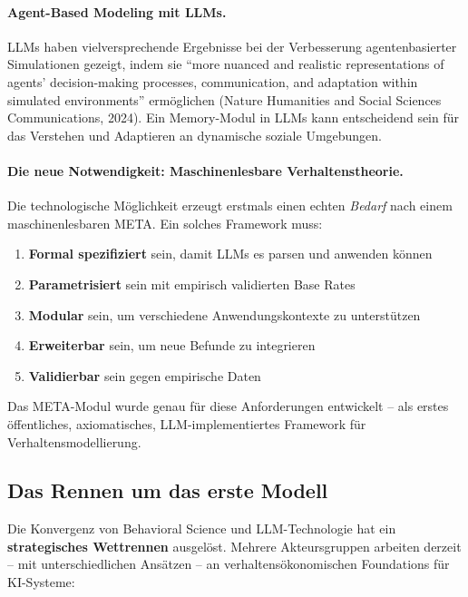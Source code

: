 \paragraph{Agent-Based Modeling mit LLMs.}
LLMs haben vielversprechende Ergebnisse bei der Verbesserung agentenbasierter Simulationen gezeigt, indem sie ``more nuanced and realistic representations of agents' decision-making processes, communication, and adaptation within simulated environments'' ermöglichen (Nature Humanities and Social Sciences Communications, 2024). Ein Memory-Modul in LLMs kann entscheidend sein für das Verstehen und Adaptieren an dynamische soziale Umgebungen.

\paragraph{Die neue Notwendigkeit: Maschinenlesbare Verhaltenstheorie.}
Die technologische Möglichkeit erzeugt erstmals einen echten \textit{Bedarf} nach einem maschinenlesbaren META. Ein solches Framework muss:

\begin{enumerate}[label=(\roman*)]
    \item \textbf{Formal spezifiziert} sein, damit LLMs es parsen und anwenden können
    \item \textbf{Parametrisiert} sein mit empirisch validierten Base Rates
    \item \textbf{Modular} sein, um verschiedene Anwendungskontexte zu unterstützen
    \item \textbf{Erweiterbar} sein, um neue Befunde zu integrieren
    \item \textbf{Validierbar} sein gegen empirische Daten
\end{enumerate}

Das \BCM{} META-Modul wurde genau für diese Anforderungen entwickelt -- als erstes öffentliches, axiomatisches, LLM-implementiertes Framework für Verhaltensmodellierung.

\subsection{Das Rennen um das erste Modell}

Die Konvergenz von Behavioral Science und LLM-Technologie hat ein \textbf{strategisches Wettrennen} ausgelöst. Mehrere Akteursgruppen arbeiten derzeit -- mit unterschiedlichen Ansätzen -- an verhaltensökonomischen Foundations für KI-Systeme:


